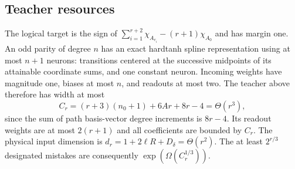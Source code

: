 \subsection{Teacher resources}

The logical target is the sign of
$\sum_{i=1}^{r+2}\chi_{A_{e_i}}-(r+1)\chi_{A_0}$ and has margin one.
An odd parity of degree $n$ has an exact hardtanh spline representation
using at most $n+1$ neurons: transitions centered at the successive
midpoints of its attainable coordinate sums, and one constant neuron.
Incoming weights have magnitude one, biases at most $n$, and
readouts at most two. The teacher above therefore has width at most
\[
 C_r=(r+3)(n_0+1)+6Ar+8r-4=\Theta(r^3),
\]
since the sum of path basis-vector degree increments is $8r-4$.
Its readout weights are at most $2(r+1)$ and all coefficients are
bounded by $C_r$. The physical input dimension is
$d_r=1+2\ell R+D_\delta=\Theta(r^2)$.
The at least $2^{r/3}$ designated mistakes are consequently
$\exp(\Omega(C_r^{1/3}))$.
